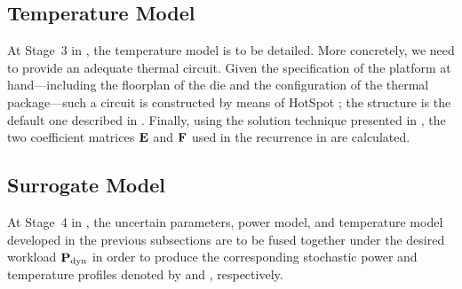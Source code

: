 \subsection{Temperature Model}

At Stage~3 in , the temperature model is to be detailed.
More concretely, we need to provide an adequate thermal  circuit. Given
the specification of the platform at hand---including the floorplan of the die
and the configuration of the thermal package---such a circuit is constructed by
means of HotSpot \cite{skadron2003}; the structure is the default one described
in . Finally, using the solution technique presented in
, the two coefficient matrices $\mathbf{E}$ and
$\mathbf{F}$ used in the recurrence in  are calculated.

\subsection{Surrogate Model}

At Stage~4 in , the uncertain parameters, power model, and
temperature model developed in the previous subsections are to be fused together
under the desired workload $\mathbf{P}_{\mathrm{dyn}}$ in order to produce the corresponding
stochastic power and temperature profiles denoted by \mp and \mq, respectively.

